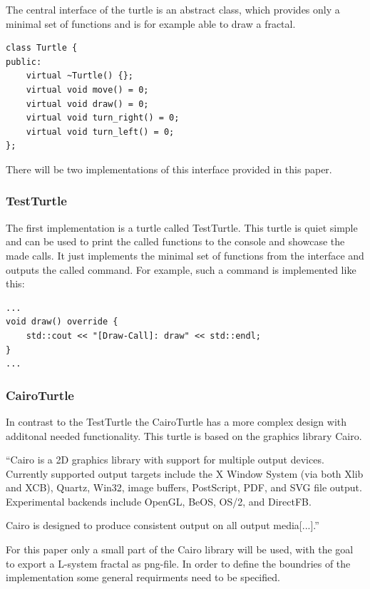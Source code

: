 \documentclass[english]{cpp-hmwk}
\begin{document}
The central interface of the turtle is an abstract class, which provides only a minimal set of functions and is for example able to draw a fractal.

\medskip
\begin{lstlisting}
class Turtle {
public:
    virtual ~Turtle() {};
    virtual void move() = 0;
    virtual void draw() = 0;
    virtual void turn_right() = 0;
    virtual void turn_left() = 0;
};
\end{lstlisting}

\noindent There will be two implementations of this interface provided in this paper. 

\subsubsection{TestTurtle}

The first implementation is a turtle called TestTurtle. This turtle is quiet simple and can be used to print the called functions to the console and showcase the made calls.
It just implements the minimal set of functions from the interface and outputs the called command. For example, such a command is implemented like this:

\medskip
\begin{lstlisting}
...
void draw() override {
    std::cout << "[Draw-Call]: draw" << std::endl;
}
...
\end{lstlisting}

\subsubsection{CairoTurtle}
In contrast to the TestTurtle the CairoTurtle has a more complex design with additonal needed functionality. This turtle is based on the graphics library Cairo.


\noindent ``Cairo is a 2D graphics library with support for multiple output devices. Currently supported output targets include the X Window System (via both Xlib and XCB), Quartz, Win32, image buffers, PostScript, PDF, and SVG file output. Experimental backends include OpenGL, BeOS, OS/2, and DirectFB.


\noindent Cairo is designed to produce consistent output on all output media[...].''\cite[Cf.]{cairohp}


\noindent For this paper only a small part of the Cairo library will be used, with the goal to export a L-system fractal as png-file. In order to define the boundries of the implementation some general requirments need to be specified.
\end{document}
